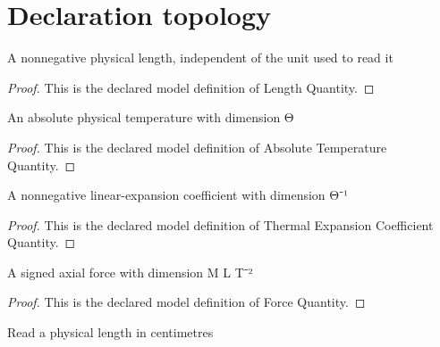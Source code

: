 \section{Declaration topology}
\begin{definition}
  \label{def:physics:phyx-mini-0465:phyxminiproblems-problemphyxmini0465-lengthquantity}
  A nonnegative physical length, independent of the unit used to read it
\end{definition}
\begin{proof}
  This is the declared model definition of Length Quantity.
\end{proof}
\begin{definition}
  \label{def:physics:phyx-mini-0465:phyxminiproblems-problemphyxmini0465-absolutetemperaturequantity}
  An absolute physical temperature with dimension Θ
\end{definition}
\begin{proof}
  This is the declared model definition of Absolute Temperature Quantity.
\end{proof}
\begin{definition}
  \label{def:physics:phyx-mini-0465:phyxminiproblems-problemphyxmini0465-thermalexpansioncoefficientquantity}
  A nonnegative linear-expansion coefficient with dimension Θ⁻¹
\end{definition}
\begin{proof}
  This is the declared model definition of Thermal Expansion Coefficient Quantity.
\end{proof}
\begin{definition}
  \label{def:physics:phyx-mini-0465:phyxminiproblems-problemphyxmini0465-forcequantity}
  A signed axial force with dimension M L T⁻²
\end{definition}
\begin{proof}
  This is the declared model definition of Force Quantity.
\end{proof}
\begin{definition}
  \label{def:physics:phyx-mini-0465:phyxminiproblems-problemphyxmini0465-lengthincentimeters}
  Read a physical length in centimetres
\end{definition}
